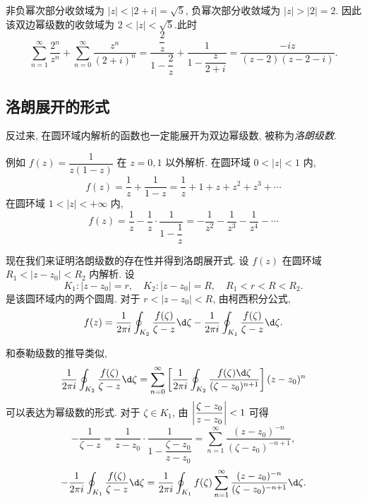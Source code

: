\begin{solution}
	非负幂次部分收敛域为 $|z|<|2+i|=\sqrt5$, 负幂次部分收敛域为 $|z|>|2|=2$.
	{因此该双边幂级数的收敛域为 $2<|z|<\sqrt5$.此时
		\[\sum_{n=1}^\infty\frac{2^n}{z^n}+\sum_{n=0}^\infty\frac{z^n}{(2+i)^n}
		=\frac{\dfrac 2z}{1-\dfrac 2z}+\frac1{1-\dfrac z{2+i}}
		=\frac{-iz}{(z-2)(z-2-i)}.\]}
\end{solution}

\subsection{洛朗展开的形式}

反过来, 在圆环域内解析的函数也一定能展开为双边幂级数, 被称为\emph{洛朗级数}.

例如 $f(z)=\dfrac1{z(1-z)}$ 在 $z=0,1$ 以外解析.
在圆环域 $0<|z|<1$ 内,
\[f(z)=\frac1z+\frac1{1-z}=\frac1z+1+z+z^2+z^3+\cdots\]
在圆环域 $1<|z|<+\infty$ 内,
\[f(z)=\frac1z-\frac1z\cdot\frac1{1-\dfrac1z}=-\frac1{z^2}-\frac1{z^3}-\frac1{z^4}-\cdots\]

现在我们来证明洛朗级数的存在性并得到洛朗展开式.
设 $f(z)$ 在圆环域 $R_1<|z-z_0|<R_2$ 内解析.
设
	\[K_1:|z-z_0|=r,\quad K_2:|z-z_0|=R,\quad R_1<r<R<R_2.\]
是该圆环域内的两个圆周. 
对于 $r<|z-z_0|<R$, 由柯西积分公式,
\[f(z)=\frac1{2\pi i}
	\oint_{K_2}\frac{f(\zeta)}{\zeta-z}\d\zeta
	-\frac1{2\pi i}\oint_{K_1}\frac{f(\zeta)}{\zeta-z}\d\zeta.\]

\begin{center}
\end{center}

和泰勒级数的推导类似,
	\[\frac1{2\pi i}\oint_{K_2}\frac{f(\zeta)}{\zeta-z}\d\zeta
	=\sum_{n=0}^\infty\left[\frac1{2\pi i}\oint_{K_2}\frac{f(\zeta)\d\zeta}{(\zeta-z_0)^{n+1}}\right](z-z_0)^n\]
可以表达为幂级数的形式.
对于 $\zeta\in K_1$, 由 $\left|\dfrac{\zeta-z_0}{z-z_0}\right|<1$ 可得
	\[-\frac1{\zeta-z}=\frac1{z-z_0}\cdot\frac1{1-\dfrac{\zeta-z_0}{z-z_0}}=\sum_{n=1}^\infty\frac{(z-z_0)^{-n}}{(\zeta-z_0)^{-n+1}},\]
	\[-\frac1{2\pi i}\oint_{K_1}\frac{f(\zeta)}{\zeta-z}\d\zeta=\frac1{2\pi i}\oint_{K_1}f(\zeta)\sum_{n=1}^\infty\frac{(z-z_0)^{-n}}{(\zeta-z_0)^{-n+1}}\d\zeta.\]

